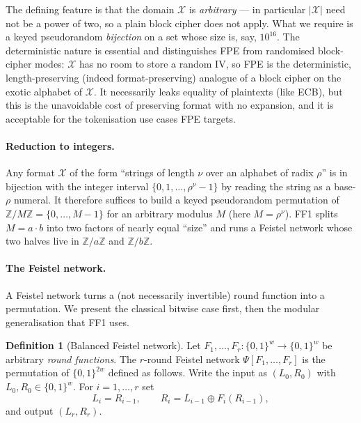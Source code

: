 \documentclass[11pt,a4paper]{article}
\theoremstyle{definition}
\newtheorem{definition}[theorem]{Definition}
\theoremstyle{remark}
\newcommand{\Z}{\ensuremath{\mathbb{Z}}}
\begin{document}
The defining feature is that the domain \(\mathcal{X}\) is \emph{arbitrary} --- in particular \(|\mathcal{X}|\) need not be a power of two, so a plain block cipher does not apply. What we require is a keyed pseudorandom \emph{bijection} on a set whose size is, say, \(10^{16}\). The deterministic nature is essential and distinguishes FPE from randomised block-cipher modes: \(\mathcal{X}\) has no room to store a random IV, so FPE is the deterministic, length-preserving (indeed format-preserving) analogue of a block cipher on the exotic alphabet of \(\mathcal{X}\). It necessarily leaks equality of plaintexts (like ECB), but this is the unavoidable cost of preserving format with no expansion, and it is acceptable for the tokenisation use cases FPE targets.

\paragraph{Reduction to integers.} Any format \(\mathcal{X}\) of the form ``strings of length \(\nu\) over an alphabet of radix \(\rho\)'' is in bijection with the integer interval \(\{0, 1, \dots, \rho^{\nu} - 1\}\) by reading the string as a base-\(\rho\) numeral. It therefore suffices to build a keyed pseudorandom permutation of \(\Z/M\Z = \{0, \dots, M-1\}\) for an arbitrary modulus \(M\) (here \(M = \rho^{\nu}\)). FF1 splits \(M = a \cdot b\) into two factors of nearly equal ``size'' and runs a Feistel network whose two halves live in \(\Z/a\Z\) and \(\Z/b\Z\).

\paragraph{The Feistel network.} A Feistel network turns a (not necessarily invertible) round function into a permutation. We present the classical bitwise case first, then the modular generalisation that FF1 uses.

\begin{definition}[Balanced Feistel network]\label{prf:def:feistel}
Let \(F_1, \dots, F_r \colon \{0,1\}^{w} \to \{0,1\}^{w}\) be arbitrary \emph{round functions}. The \(r\)-round Feistel network \(\Psi[F_1, \dots, F_r]\) is the permutation of \(\{0,1\}^{2w}\) defined as follows. Write the input as \((L_0, R_0)\) with \(L_0, R_0 \in \{0,1\}^{w}\). For \(i = 1, \dots, r\) set
\[
  L_i = R_{i-1}, \qquad R_i = L_{i-1} \oplus F_i(R_{i-1}),
\]
and output \((L_r, R_r)\).
\end{definition}
\end{document}
